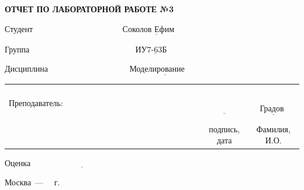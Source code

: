 \begin{titlepage}
	
	\begin{center}
		\noindent\begin{minipage}{1.2\textwidth}\centering
			\textbf{ОТЧЕТ ПО ЛАБОРАТОРНОЙ РАБОТЕ №3}\newline\newline\newline
		\end{minipage}
	\end{center}

	\noindent Студент $\underline{\text{~~~~~~~~~~~~~~~~~~~~~~~~~~~~~~~~Соколов Ефим~~~~~~~~~~~~~~~~~~~~~~~~~~~~~~~~~~~~~~}}$
	
	\noindent Группа $\underline{\text{~~~~~~~~~~~~~~~~~~~~~~~~~~~~~~~~~~~~~~ИУ7-63Б~~~~~~~~~~~~~~~~~~~~~~~~~~~~~~~~~~~~~~~~~}}$
	
	\noindent Дисциплина $\underline{\text{~~~~~~~~~~~~~~~~~~~~~~~~~~~~~Моделирование~~~~~~~~~~~~~~~~~~~~~~~~~~~~~~~~~~~}}$\newline
	
	
	\noindent\begin{tabular}{lcc}
		&&\\
		&&\\
		&&\\
		&&\\
		Преподаватель: ~~~~~~~~~~~~~~~~~~~~~~~~~~~~~~~~~~~~~~~~~& $\underline{\text{~~~~~~~~~~~~}}$ & $\underline{\text{~~~Градов В.М.~~~}}$ \\
		& \footnotesize подпись, дата & \footnotesize Фамилия, И.О. \\
	\end{tabular}
	\newline\newline\newline
	\noindent Оценка $\underline{\text{~~~~~~~~~~~~~~~~~~~~~~~~~~~~~~~~~~~~}}$
	
	
	\begin{center}
		\vfill
		Москва~---~\the\year
		~г.
	\end{center}
 \restoregeometry
\end{titlepage}
